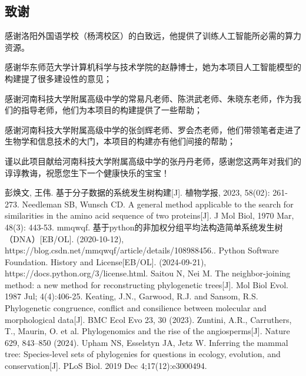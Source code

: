 \documentclass{article}
\begin{document}
\begin{multicols}{2}
\subsection{致谢}
\par
感谢洛阳外国语学校（杨湾校区）的白致远，他提供了训练人工智能所必需的算力资源。
\par
感谢华东师范大学计算机科学与技术学院的赵静博士，她为本项目人工智能模型的构建提了很多建设性的意见；
\par
感谢河南科技大学附属高级中学的常易凡老师、陈洪武老师、朱晓东老师，作为我们的指导老师，他们为本项目的构建提供了一些帮助；
\par
感谢河南科技大学附属高级中学的张剑辉老师、罗会杰老师，他们带领笔者走进了生物学和信息技术的大门，本项目的构建亦有他们间接的帮助；
\par
谨以此项目献给河南科技大学附属高级中学的张丹丹老师，感谢您这两年对我们的谆谆教诲，祝愿您生下一个健康快乐的宝宝！



\begingroup
\renewcommand{\section}[2]{}
\begin{thebibliography}{100}
     彭焕文, 王伟. 基于分子数据的系统发生树构建[J]. 植物学报, 2023, 58(02): 261-273.
     Needleman SB, Wunsch CD. A general method applicable to the search for similarities in the amino acid sequence of two proteins[J]. J Mol Biol, 1970 Mar, 48(3): 443-53.
     mmqwqf. 基于python的非加权分组平均法构造简单系统发生树（DNA）[EB/OL]. (2020-10-12), https://blog.csdn.net/mmqwqf/article\newline/details/108988456..
     Python Software Foundation. History and License[EB/OL]. (2024-09-21), https://docs.python.org/3/license.html.
     Saitou N, Nei M. The neighbor-joining method: a new method for reconstructing phylogenetic trees[J]. Mol Biol Evol. 1987 Jul; 4(4):406-25.
     Keating, J.N., Garwood, R.J. and Sansom, R.S. Phylogenetic congruence, conflict and consilience between molecular and morphological data[J]. BMC Ecol Evo 23, 30 (2023).
     Zuntini, A.R., Carruthers, T., Maurin, O. et al. Phylogenomics and the rise of the angiosperms[J]. Nature 629, 843–850 (2024).
     Upham NS, Esselstyn JA, Jetz W. Inferring the mammal tree: Species-level sets of phylogenies for questions in ecology, evolution, and conservation[J]. PLoS Biol. 2019 Dec 4;17(12):e3000494.
\end{thebibliography}
\endgroup
\end{multicols}
\end{document}
